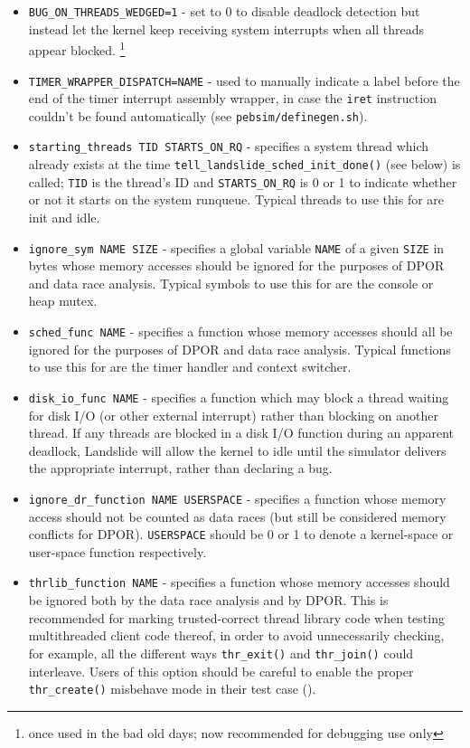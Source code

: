\begin{itemize}
	\item {\tt BUG\_ON\_THREADS\_WEDGED=1} - set to 0 to disable deadlock detection but instead let the kernel keep receiving system interrupts when all threads appear blocked.%
		\footnote{once used in the bad old days; now recommended for debugging use only}
	\item {\tt TIMER\_WRAPPER\_DISPATCH=NAME} - used to manually indicate a label before the end of the timer interrupt assembly wrapper, in case the {\tt iret} instruction couldn't be found automatically (see {\tt pebsim/definegen.sh}).
	\item {\tt starting\_threads TID STARTS\_ON\_RQ} - specifies a system thread which already exists at the time {\tt tell\_landslide\_sched\_init\_done()} (see below) is called; {\tt TID} is the thread's ID and {\tt STARTS\_ON\_RQ} is 0 or 1 to indicate whether or not it starts on the system runqueue.
		Typical threads to use this for are init and idle.
	\item {\tt ignore\_sym NAME SIZE} - specifies a global variable {\tt NAME} of a given {\tt SIZE} in bytes whose memory accesses should be ignored for the purposes of DPOR and data race analysis.
		Typical symbols to use this for are the console or heap mutex.
	\item {\tt sched\_func NAME} - specifies a function whose memory accesses should all be ignored for the purposes of DPOR and data race analysis.
		Typical functions to use this for are the timer handler and context switcher.
	\item {\tt disk\_io\_func NAME} - specifies a function which may block a thread waiting for disk I/O (or other external interrupt) rather than blocking on another thread.
		If any threads are blocked in a disk I/O function during an apparent deadlock,
		Landslide will allow the kernel to idle until the simulator delivers the appropriate interrupt,
		rather than declaring a bug.
	\item {\tt ignore\_dr\_function NAME USERSPACE} - specifies a function whose memory access should not be counted as data races (but still be considered memory conflicts for DPOR).
		{\tt USERSPACE} should be 0 or 1 to denote a kernel-space or user-space function respectively.
	\item {\tt thrlib\_function NAME} - specifies a function whose memory accesses should be ignored both by the data race analysis and by DPOR.
		This is recommended for marking trusted-correct thread library code when testing multithreaded client code thereof,
		in order to avoid unnecessarily checking, for example,
		all the different ways {\tt thr\_exit()} and {\tt thr\_join()} could interleave.
		Users of this option should be careful to enable the proper {\tt thr\_create()} misbehave mode in their test case (\sect{\ref{sec:landslide-friendly-misbehave}}).
\end{itemize}

